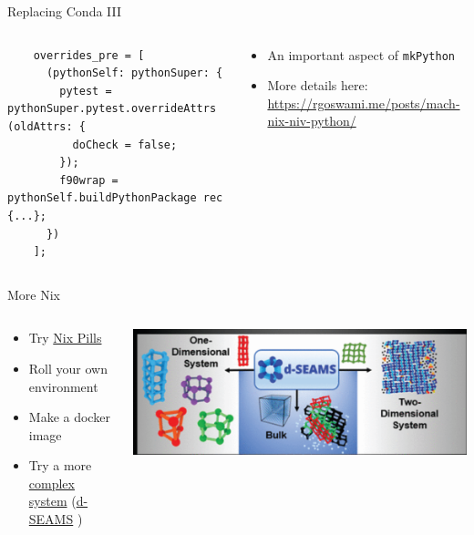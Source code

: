 \documentclass[bigger,unknownkeysallowed,aspectratio=169,red,colorblocks]{beamer}
\begin{document}
\begin{frame}[label={sec:org0cf1eec},fragile]{Replacing Conda III}
 \begin{columns}
\begin{column}{0.6\columnwidth}
\begin{verbatim}
    overrides_pre = [
      (pythonSelf: pythonSuper: {
        pytest = pythonSuper.pytest.overrideAttrs (oldAttrs: {
          doCheck = false;
        });
        f90wrap = pythonSelf.buildPythonPackage rec {...};
      })
    ];
\end{verbatim}
\end{column}
\begin{column}{0.4\columnwidth}
\begin{itemize}
\item An important aspect of \texttt{mkPython}
\item More details here: \url{https://rgoswami.me/posts/mach-nix-niv-python/}
\end{itemize}
\end{column}
\end{columns}
\end{frame}
\begin{frame}[label={sec:org49b51d2}]{More Nix}
\begin{columns}
\begin{column}{0.6\columnwidth}
\begin{itemize}
\item Try \href{https://nixos.org/nixos/nix-pills/why-you-should-give-it-a-try.html}{Nix Pills}
\item Roll your own environment
\item Make a docker image
\item Try a more \href{https://github.com/d-SEAMS/seams-core/blob/691da72262db40625774a2aed05d23c17a211360/nix/pkgs/sharkML/sharkML.nix}{complex system} (\href{https://dseams.info}{d-SEAMS} \cite{goswamiDSEAMSDeferredStructural2020})
\end{itemize}
\end{column}
\begin{column}{0.4\columnwidth}
\begin{center}
\includegraphics[width=.9\linewidth]{images/A_screenshot/2020-05-22_23-54-29_screenshot.png}
\end{center}
\end{column}
\end{columns}
\end{frame}
\end{document}
